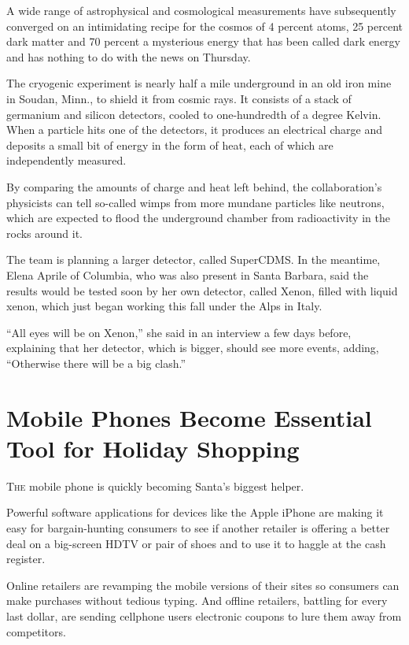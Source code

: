﻿\documentclass[12pt]{article}
\begin{document}
A wide range of astrophysical and cosmological measurements have subsequently converged on an
intimidating recipe for the cosmos of 4 percent atoms, 25 percent dark matter and 70 percent a
mysterious energy that has been called dark energy and has nothing to do with the news on Thursday.

The cryogenic experiment is nearly half a mile underground in an old iron mine in Soudan, Minn., to
shield it from cosmic rays. It consists of a stack of germanium and silicon detectors, cooled to
one-hundredth of a degree Kelvin. When a particle hits one of the detectors, it produces an
electrical charge and deposits a small bit of energy in the form of heat, each of which are
independently measured.

By comparing the amounts of charge and heat left behind, the collaboration's physicists can tell
so-called wimps from more mundane particles like neutrons, which are expected to flood the
underground chamber from radioactivity in the rocks around it.

The team is planning a larger detector, called SuperCDMS. In the meantime, Elena Aprile of Columbia,
who was also present in Santa Barbara, said the results would be tested soon by her own detector,
called Xenon, filled with liquid xenon, which just began working this fall under the Alps in Italy.

``All eyes will be on Xenon,'' she said in an interview a few days before, explaining that her
detector, which is bigger, should see more events, adding, ``Otherwise there will be a big clash.''

\section{Mobile Phones Become Essential Tool for Holiday Shopping}

\lettrine{T}{he} mobile phone is quickly becoming Santa's biggest helper.

Powerful software applications for devices like the Apple iPhone are making it easy for
bargain-hunting consumers to see if another retailer is offering a better deal on a big-screen HDTV
or pair of shoes and to use it to haggle at the cash register.

Online retailers are revamping the mobile versions of their sites so consumers can make purchases
without tedious typing. And offline retailers, battling for every last dollar, are sending cellphone
users electronic coupons\cite{coupon} to lure them away from competitors.
\end{document}
